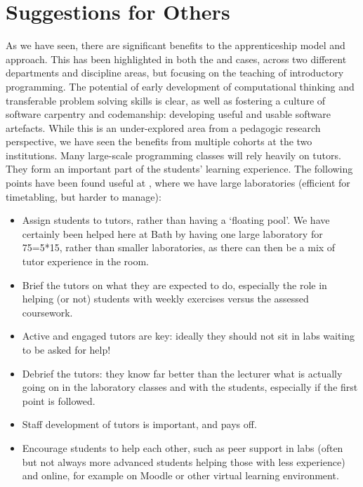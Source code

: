 \documentclass[conference,compsoc]{IEEEtran}
\begin{document}
\section{Suggestions for Others}

As we have seen, there are significant benefits to the apprenticeship model and approach. This has been highlighted in both the \Bath{} and \Cardiff{} cases, across two different departments and discipline areas, but focusing on the teaching of introductory programming. The potential of early development of computational thinking and transferable problem solving skills is clear, as well as fostering a culture of software carpentry and codemanship: developing useful and usable software artefacts. While this is an under-explored area from a pedagogic research perspective, we have seen the benefits from multiple cohorts at the two institutions.
Many large-scale programming classes will rely heavily on tutors. They form an important part of the students' learning experience. The following points have been found useful at \Bath, where we have large laboratories (efficient for timetabling, but harder to manage):
\begin{itemize}
\item	Assign students to tutors, rather than having a `floating pool'. We have certainly been helped here at Bath by having one large laboratory for 75=5*15, rather than smaller laboratories, as there can then be a mix of tutor experience in the room.
\item	Brief the tutors on what they are expected to do, especially the role in helping (or not) students with weekly exercises versus the assessed coursework.
\item	Active and engaged tutors are key: ideally they should not sit in labs waiting to be asked for help!
\item	Debrief the tutors: they know far better than the lecturer what is actually going on in the laboratory classes and with the students, especially if the first point is followed.
\item	Staff development of tutors is important, and pays off.
\item Encourage students to help each other, such as peer support in labs (often but not always more advanced students helping those with less experience) and online, for example on Moodle or other virtual learning environment.
\end{itemize} 
\end{document}
